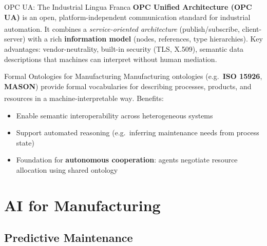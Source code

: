 \begin{v3topic}{OPC UA: The Industrial Lingua Franca}
    \textbf{OPC Unified Architecture (OPC UA)} is an open, platform-independent communication standard for industrial automation\textsuperscript{\cite[][pp.~45--60]{veneriHandsOnIndustrialInternet2018}}.
    It combines a \emph{service-oriented architecture} (publish/subscribe, client-server) with a rich \textbf{information model} (nodes, references, type hierarchies).
    Key advantages: vendor-neutrality, built-in security (TLS, X.509), semantic data descriptions that machines can interpret without human mediation.

\end{v3topic}
\begin{v3topic}{Formal Ontologies for Manufacturing}
    Manufacturing ontologies (e.g.\ \textbf{ISO 15926}, \textbf{MASON}) provide formal vocabularies for describing processes, products, and resources in a machine-interpretable way\textsuperscript{\cite[][pp.~8--12]{dafflonChallengesApproachesCPS2021}}.
    Benefits:
    \begin{itemize}
        \item Enable semantic interoperability across heterogeneous systems
        \item Support automated reasoning (e.g.\ inferring maintenance needs from process state)
        \item Foundation for \textbf{autonomous cooperation}: agents negotiate resource allocation using shared ontology
    \end{itemize}
\end{v3topic}

\section{AI for Manufacturing}

\subsection{Predictive Maintenance}

